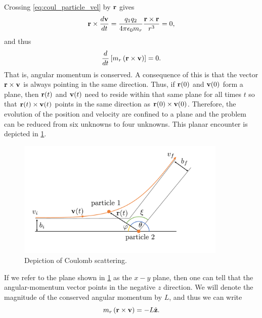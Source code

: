 \documentclass[a4paper,11pt]{report}
\begin{document}
Crossing \cref{eq:coul_particle_vel} by $\mathbf{r}$ gives
\begin{equation*}
    \mathbf{r} \times \frac{d \mathbf{v}}{dt} = \frac{q_1 q_2}{4 \pi \epsilon_0 m_r} \frac{\mathbf{r} \times \mathbf{r}}{r^3} = 0,
\end{equation*}
and thus
\begin{equation*}
    \frac{d}{dt} \left [ m_r \left ( \mathbf{r} \times \mathbf{v} \right ) \right ] = 0.
\end{equation*}
That is, angular momentum is conserved. A consequence of this is that the vector $\mathbf{r} \times \mathbf{v}$ is always pointing in the same direction. Thus, if $\mathbf{r}(0)$ and $\mathbf{v}(0)$ form a plane, then $\mathbf{r}(t)$ and $\mathbf{v}(t)$ need to reside within that same plane for all times $t$ so that $\mathbf{r}(t) \times \mathbf{v}(t)$ points in the same direction as $\mathbf{r}(0) \times \mathbf{v}(0)$. Therefore, the evolution of the position and velocity are confined to a plane and the problem can be reduced from six unknowns to four unknowns. This planar encounter is depicted in \cref{fig:coulomb_scattering}.
\begin{figure}[ht]
    \centering
    \includegraphics[width=10cm]{../../images/coulomb_scattering.pdf}
    \caption{Depiction of Coulomb scattering.}
    \label{fig:coulomb_scattering}
\end{figure}

If we refer to the plane shown in \cref{fig:coulomb_scattering} as the $x-y$ plane, then one can tell that the angular-momentum vector points in the negative $z$ direction. We will denote the magnitude of the conserved angular momentum by $L$, and thus we can write
\begin{equation}
    \label{eq:coul_cons_angular_momentum}
    m_r \left (\mathbf{r} \times \mathbf{v} \right ) = -L \hat{\mathbf{z}}.
\end{equation}
\end{document}
